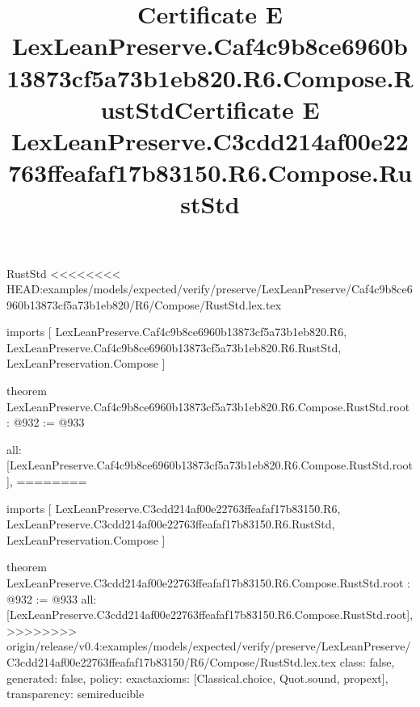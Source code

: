 \begin{lexlean}{RustStd}
<<<<<<<< HEAD:examples/models/expected/verify/preserve/LexLeanPreserve/Caf4c9b8ce6960b13873cf5a73b1eb820/R6/Compose/RustStd.lex.tex
\title{Certificate E LexLeanPreserve.Caf4c9b8ce6960b13873cf5a73b1eb820.R6.Compose.RustStd}
\begin{coremodule}
imports [
  LexLeanPreserve.Caf4c9b8ce6960b13873cf5a73b1eb820.R6,
  LexLeanPreserve.Caf4c9b8ce6960b13873cf5a73b1eb820.R6.RustStd,
  LexLeanPreservation.Compose
]

theorem LexLeanPreserve.Caf4c9b8ce6960b13873cf5a73b1eb820.R6.Compose.RustStd.root : @932 := @933 {
  all: [LexLeanPreserve.Caf4c9b8ce6960b13873cf5a73b1eb820.R6.Compose.RustStd.root],
========
\title{Certificate E LexLeanPreserve.C3cdd214af00e22763ffeafaf17b83150.R6.Compose.RustStd}
\begin{coremodule}
imports [
  LexLeanPreserve.C3cdd214af00e22763ffeafaf17b83150.R6,
  LexLeanPreserve.C3cdd214af00e22763ffeafaf17b83150.R6.RustStd,
  LexLeanPreservation.Compose
]

theorem LexLeanPreserve.C3cdd214af00e22763ffeafaf17b83150.R6.Compose.RustStd.root : @932 := @933 {
  all: [LexLeanPreserve.C3cdd214af00e22763ffeafaf17b83150.R6.Compose.RustStd.root],
>>>>>>>> origin/release/v0.4:examples/models/expected/verify/preserve/LexLeanPreserve/C3cdd214af00e22763ffeafaf17b83150/R6/Compose/RustStd.lex.tex
  class: false,
  generated: false,
  policy: exact{axioms: [Classical.choice, Quot.sound, propext]},
  transparency: semireducible
}


\end{coremodule}}
\end{coremodule}
\end{lexlean}
